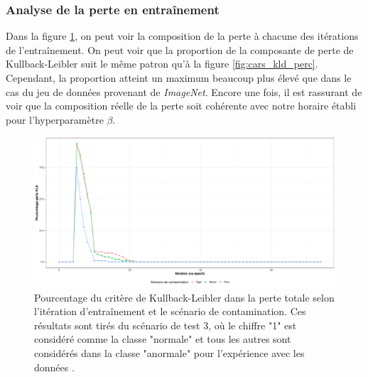 \subsubsection{Analyse de la perte en entraînement}

Dans la figure \ref{fig:mnist_kld_perc}, on peut voir la composition de la perte à chacune des itérations de l'entraînement. On peut voir que la proportion de la composante de perte de Kullback-Leibler suit le même patron qu'à la figure \ref{fig:cars_kld_perc}. Cependant, la proportion atteint un maximum beaucoup plus élevé que dans le cas du jeu de données provenant de \textit{ImageNet}. Encore une fois, il est rassurant de voir que la composition réelle de la perte soit cohérente avec notre horaire établi pour l'hyperparamètre $\beta$. 

\begin{figure}[h]
	\centering
	\includegraphics[width=\linewidth]{images/kld_mnist_scenario_3.pdf}
	\caption[Pourcentage du critère de Kullback-Leibler dans la perte totale selon l'itération d'entraînement et le scénario de contamination]{Pourcentage du critère de Kullback-Leibler dans la perte totale selon l'itération d'entraînement et le scénario de contamination. Ces résultats sont tirés du scénario de test 3, où le chiffre "1" est considéré comme la classe "normale" et tous les autres sont considérés dans la classe "anormale" pour l'expérience avec les données .}
	\label{fig:mnist_kld_perc}
\end{figure}

